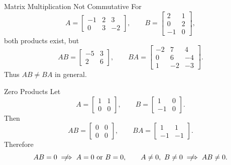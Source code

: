 \begin{frame}{Matrix Multiplication Not Commutative}
For
\[
A=\begin{bmatrix}-1&2&3\\0&3&-2\end{bmatrix},\qquad
B=\begin{bmatrix}2&1\\0&2\\-1&0\end{bmatrix},
\]
both products exist, but
\[
AB=\begin{bmatrix}-5&3\\2&6\end{bmatrix},\qquad
BA=\begin{bmatrix}-2&7&4\\0&6&-4\\1&-2&-3\end{bmatrix}.
\]
Thus $AB\ne BA$ in general.
\end{frame}

\begin{frame}{Zero Products}
Let
\[
A=\begin{bmatrix}1&1\\0&0\end{bmatrix},\qquad
B=\begin{bmatrix}1&0\\-1&0\end{bmatrix}.
\]
Then
\[
AB=\begin{bmatrix}0&0\\0&0\end{bmatrix},\qquad
BA=\begin{bmatrix}1&1\\-1&-1\end{bmatrix}.
\]
Therefore
\[
AB=0\centernot\implies A=0\text{ or }B=0,
\qquad
A\ne0,\ B\ne0\centernot\implies AB\ne0.
\]
\end{frame}


